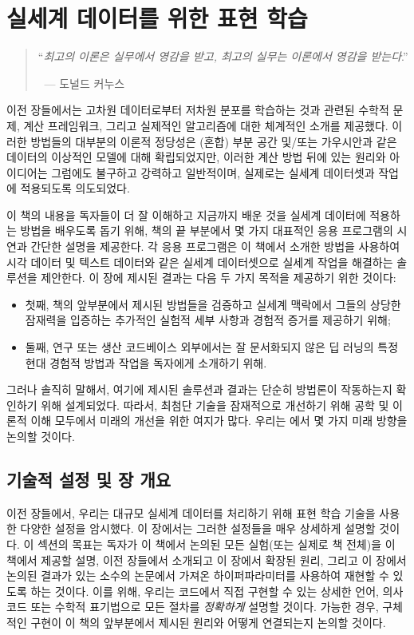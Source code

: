 \documentclass[../../book-main_ko.tex]{subfiles}
\begin{document}
\chapter{실세계 데이터를 위한 표현 학습}
\label{ch:applications}

\begin{quote}
\hfill    ``{\em 최고의 이론은 실무에서 영감을 받고, 최고의 실무는 이론에서 영감을 받는다}.''

$~$ \hfill --- 도널드 커누스
\end{quote}
\vspace{5mm}

이전 장들에서는 고차원 데이터로부터 저차원 분포를 학습하는 것과 관련된 수학적 문제, 계산 프레임워크, 그리고 실제적인 알고리즘에 대한 체계적인 소개를 제공했다. 이러한 방법들의 대부분의 이론적 정당성은 (혼합) 부분 공간 및/또는 가우시안과 같은 데이터의 이상적인 모델에 대해 확립되었지만, 이러한 계산 방법 뒤에 있는 원리와 아이디어는 그럼에도 불구하고 강력하고 일반적이며, 실제로는 실세계 데이터셋과 작업에 적용되도록 의도되었다.

이 책의 내용을 독자들이 더 잘 이해하고 지금까지 배운 것을 실세계 데이터에 적용하는 방법을 배우도록 돕기 위해, 책의 끝 부분에서 몇 가지 대표적인 응용 프로그램의 시연과 간단한 설명을 제공한다. 각 응용 프로그램은 이 책에서 소개한 방법을 사용하여 시각 데이터 및 텍스트 데이터와 같은 실세계 데이터셋으로 실세계 작업을 해결하는 솔루션을 제안한다. 이 장에 제시된 결과는 다음 두 가지 목적을 제공하기 위한 것이다:
\begin{itemize}
    \item 첫째, 책의 앞부분에서 제시된 방법들을 검증하고 실세계 맥락에서 그들의 상당한 잠재력을 입증하는 추가적인 실험적 세부 사항과 경험적 증거를 제공하기 위해;
    \item 둘째, 연구 또는 생산 코드베이스 외부에서는 잘 문서화되지 않은 딥 러닝의 특정 현대 경험적 방법과 작업을 독자에게 소개하기 위해.
\end{itemize}
그러나 솔직히 말해서, 여기에 제시된 솔루션과 결과는 단순히 방법론이 작동하는지 확인하기 위해 설계되었다. 따라서, 최첨단 기술을 잠재적으로 개선하기 위해 공학 및 이론적 이해 모두에서 미래의 개선을 위한 여지가 많다. 우리는 에서 몇 가지 미래 방향을 논의할 것이다.

\section{기술적 설정 및 장 개요}\label{sec:experiment_setup}

이전 장들에서, 우리는 대규모 실세계 데이터를 처리하기 위해 표현 학습 기술을 사용한 다양한 설정을 암시했다. 이 장에서는 그러한 설정들을 매우 상세하게 설명할 것이다. 이 섹션의 목표는 독자가 이 책에서 논의된 모든 실험(또는 실제로 책 전체)을 이 책에서 제공할 설명, 이전 장들에서 소개되고 이 장에서 확장된 원리, 그리고 이 장에서 논의된 결과가 있는 소수의 논문에서 가져온 하이퍼파라미터를 사용하여 재현할 수 있도록 하는 것이다. 이를 위해, 우리는 코드에서 직접 구현할 수 있는 상세한 언어, 의사 코드 또는 수학적 표기법으로 모든 절차를 \textit{정확하게} 설명할 것이다. 가능한 경우, 구체적인 구현이 이 책의 앞부분에서 제시된 원리와 어떻게 연결되는지 논의할 것이다.
\end{document}
